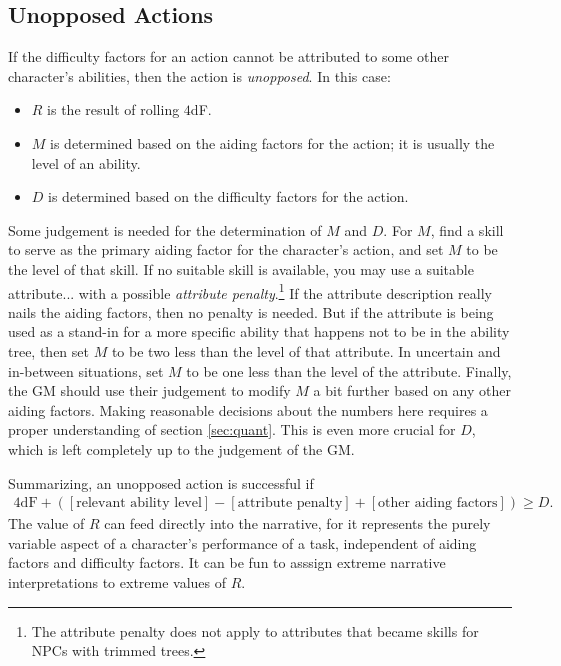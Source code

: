 \documentclass[12pt]{article}
\begin{document}
\subsection{Unopposed Actions}\label{sec:unopposed}
If the difficulty factors for an action cannot be attributed to some other character's abilities,
then the action is \emph{unopposed}.
In this case:
\vspace{-1em}
\begin{itemize}
\item $R$ is the result of rolling $4$dF.
\item $M$ is determined based on the aiding factors for the action; it is usually the level of an ability.
\item $D$ is determined based on the difficulty factors for the action.
\end{itemize}
Some judgement is needed for the determination of $M$ and $D$. For $M$,
find a skill to serve as the primary aiding factor for the character's action,
and set $M$ to be the level of that skill.
If no suitable skill is available, you may use a suitable attribute... with a possible \emph{attribute penalty}.\footnote{
The attribute penalty does not apply to attributes that became skills for NPCs with trimmed trees.}
If the attribute description really nails the aiding factors, then no penalty is needed.
But if the attribute is being used as a stand-in for a more specific ability that happens not to be in the ability tree,
then set $M$ to be two less than the level of that attribute.
In uncertain and in-between situations, set $M$ to be one less than the level of the attribute.
Finally, the GM should use their judgement to modify $M$ a bit further based on any other aiding factors.
Making reasonable decisions about the numbers here requires a proper understanding of section \ref{sec:quant}.
This is even more crucial for $D$, which is left completely up to the judgement of the GM.

Summarizing, an unopposed action is successful if
\begin{align*}
4\text{dF}
+([\text{relevant ability level}]
-[\text{attribute penalty}]
+[\text{other aiding factors}])
\geq D.
\end{align*}
The value of $R$ can feed directly into the narrative,
for it represents the purely variable aspect of a character's performance of a task,
independent of aiding factors and difficulty factors.
It can be fun to asssign extreme narrative interpretations to extreme values of $R$.
\end{document}
